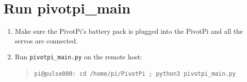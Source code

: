 \documentclass[11pt,oneside]{article}
\makeatletter
\newcommand{\remoteCommandAfterRename}[1]{\begin{quote} \texttt{pi@pulse000: #1} \end{quote}}
\makeatother
\begin{document}
\section{Run pivotpi\_main}
\begin{enumerate}
	\item Make sure the PivotPi's battery pack is plugged into the PivotPi and all the servos are connected.
	\item Run \texttt{pivotpi\_main.py} on the remote host: \remoteCommandAfterRename{cd /home/pi/PivotPi ; python3 pivotpi\_main.py}
\end{enumerate}
\end{document}
